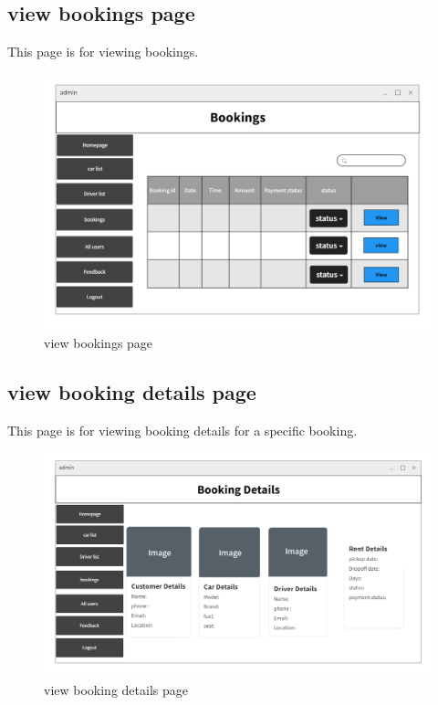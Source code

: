 \documentclass[a4paper,12pt,toc=flat]{report}
\begin{document}
	\pagebreak
	
	
	
			\subsection{ view bookings page}
\hspace*{12pt}
	This page is for viewing bookings.
	\begin{figure}[bph]
	\begin{center}
		\includegraphics[width=1.1 \linewidth, height=0.7\textheight]{"admin_bookings.png"}
	\end{center}
		\caption{ view bookings page}
	\end{figure}

	\pagebreak
	
	
		\subsection{ view booking details page}
\hspace*{12pt}
	This page is for viewing booking details for a specific booking.
	\begin{figure}[bph]
	\begin{center}
		\includegraphics[width=1.1 \linewidth, height=0.7\textheight]{"admin_booking_details.png"}
	\end{center}
		\caption{ view booking details page}
	\end{figure}
\end{document}
